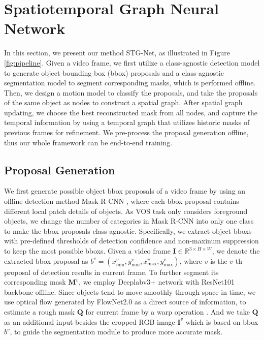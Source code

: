 \documentclass[letterpaper]{article} %
\begin{document}
\section{Spatiotemporal Graph Neural Network}
In this section, we present our method STG-Net, as illustrated in Figure \ref{fig:pipeline}. Given a video frame, we first utilize a class-agnostic detection model to generate object bounding box (bbox) proposals and a class-agnostic segmentation model to segment corresponding masks, which is performed offline. Then, we design a motion model to classify the proposals, and take the proposals of the same object as nodes to construct a spatial graph. After spatial graph updating, we choose the best reconstructed mask from all nodes, and capture the temporal information by using a temporal graph that utilizes historic masks of previous frames for refinement. We pre-process the proposal generation offline, thus our whole framework can be end-to-end training.

\subsection{Proposal Generation}
We first generate possible object bbox proposals of a video frame by using an offline detection method Mask R-CNN \cite{he2017mask}, where each bbox proposal contains different local patch details of objects. As VOS task only considers foreground objects, we change the number of categories in Mask R-CNN into only one class to make the bbox proposals class-agnostic. Specifically, we extract object bboxs with pre-defined thresholds of detection confidence and non-maxinum suppression to keep the most possible bboxs. Given a video frame $\bm{I} \in \mathbb{R}^{3 \times H\times W}$, we denote the extracted bbox proposal as $b^v = (x_{\text{min}}^v, y_{\text{min}}^v, x_{\text{max}}^v, y_{\text{max}}^v)$, where $v$ is the $v$-th proposal of detection results in current frame.
To further segment its corresponding mask $\bm{M}^v$, we employ Deeplabv3+ \cite{chen2018encoder} network with ResNet101 \cite{he2016deep} backbone offline.
Since objects tend to move smoothly through space in time, we use optical flow generated by FlowNet2.0 \cite{ilg2017flownet} as a direct source of information, to estimate a rough mask $\bm{Q}$ for current frame by a warp operation \cite{khoreva2017lucid}. And we take $\bm{Q}$ as an additional input besides the cropped RGB image $\bm{I}^v$ which is based on bbox $b^v$, to guide the segmentation module to produce more accurate mask.
\end{document}
